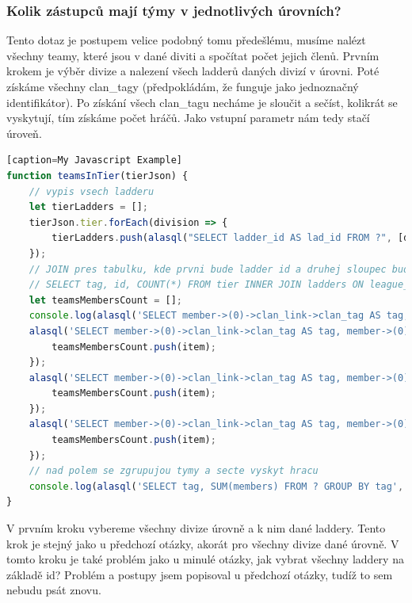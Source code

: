 \documentclass[a4, titlepage]{article}
\begin{document}
\subsubsection{Kolik zástupců mají týmy v jednotlivých úrovních?}
Tento dotaz je postupem velice podobný tomu předešlému, musíme nalézt všechny teamy, které jsou v dané diviti a spočítat počet jejich členů. Prvním krokem je výběr divize a nalezení všech ladderů daných divizí v úrovni. Poté získáme všechny clan\_tagy (předpokládám, že funguje jako jednoznačný identifikátor). Po získání všech clan\_tagu necháme je sloučit a sečíst, kolikrát se vyskytují, tím získáme počet hráčů. Jako vstupní parametr nám tedy stačí úroveň. 
\begin{lstlisting}[language=JavaScript][caption=My Javascript Example]
function teamsInTier(tierJson) {
    // vypis vsech ladderu
    let tierLadders = [];
    tierJson.tier.forEach(division => {
        tierLadders.push(alasql("SELECT ladder_id AS lad_id FROM ?", [division.division]));
    });
    // JOIN pres tabulku, kde prvni bude ladder id a druhej sloupec bude nazev ladder souboru
    // SELECT tag, id, COUNT(*) FROM tier INNER JOIN ladders ON league_id=league_id GROUP BY tag
    let teamsMembersCount = [];
    console.log(alasql('SELECT member->(0)->clan_link->clan_tag AS tag, member->(0)->clan_link->id AS id ,COUNT(*) AS members FROM ? GROUP BY member->(0)->clan_link->clan_tag',[ladder230889_1031.team]));
    alasql('SELECT member->(0)->clan_link->clan_tag AS tag, member->(0)->clan_link->id AS id ,COUNT(*) AS members FROM ? GROUP BY member->(0)->clan_link->clan_tag',[ladder230889_1031.team]).forEach(item => {
        teamsMembersCount.push(item);
    });
    alasql('SELECT member->(0)->clan_link->clan_tag AS tag, member->(0)->clan_link->id AS id ,COUNT(*) AS members FROM ? GROUP BY member->(0)->clan_link->clan_tag',[ladder230898_1031.team]).forEach(item => {
        teamsMembersCount.push(item);
    });
    alasql('SELECT member->(0)->clan_link->clan_tag AS tag, member->(0)->clan_link->id AS id ,COUNT(*) AS members FROM ? GROUP BY member->(0)->clan_link->clan_tag',[ladder230882_1031.team]).forEach(item => {
        teamsMembersCount.push(item);
    });
    // nad polem se zgrupujou tymy a secte vyskyt hracu
    console.log(alasql('SELECT tag, SUM(members) FROM ? GROUP BY tag', [teamsMembersCount]));
}
\end{lstlisting}
V prvním kroku vybereme všechny divize úrovně a k nim dané laddery. Tento krok je stejný jako u předchozí otázky, akorát pro všechny divize dané úrovně.
V tomto kroku je také problém jako u minulé otázky, jak vybrat všechny laddery na základě id? Problém a postupy jsem popisoval u předchozí otázky, tudíž to sem nebudu psát znovu. 
\end{document}
